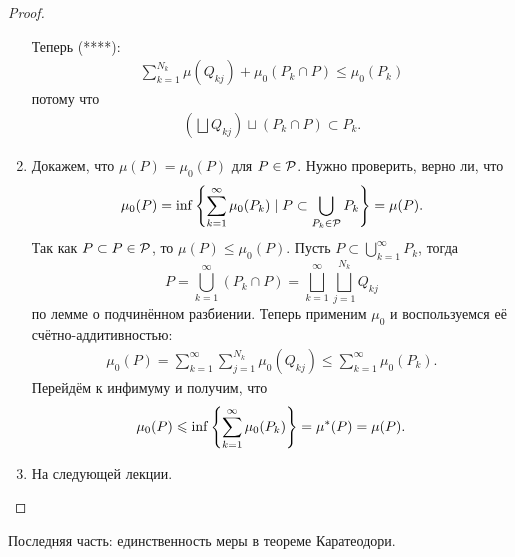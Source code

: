 \documentclass[a4paper,14pt]{extarticle}
\theoremstyle{definition}
\theoremstyle{plain}
\theoremstyle{plain}
\theoremstyle{plain}
\theoremstyle{plain}
\theoremstyle{definition}
\theoremstyle{definition}
\theoremstyle{definition}
\theoremstyle{definition}
\theoremstyle{definition}
\theoremstyle{definition}
\theoremstyle{plain}
\theoremstyle{plain}
\theoremstyle{plain}
\theoremstyle{plain}
\theoremstyle{definition}
\theoremstyle{definition}
\theoremstyle{definition}
\theoremstyle{definition}
\theoremstyle{definition}
\newcommand{\p}{\ensuremath \mathcal{P}}
\newcommand{\mua}{\ensuremath \mu^\ast}
\begin{document}
\begin{proof}
\begin{enumerate}
   Теперь (****):
   \begin{align*}
    \sum_{k=1}^{N_k}  \mu(Q_{kj}) + \mu_0(P_k \cap P) \leqslant \mu_0(P_k)
   \end{align*} потому что
   \begin{align*}
    \left( \bigsqcup Q_{kj} \right) \sqcup \left( P_k \cap P \right) \subset P_k
   .\end{align*}
  \item Докажем, что $ \mu(P) = \mu_0(P) $ для $ P \in \p $. Нужно проверить, верно ли, что
   \begin{align*}
    \mu_0(P) = \inf \left\{ \sum_{k=1}^{\infty} \mu_0(P_k) \mid P \subset \bigcup_{P_k \in \p} P_k \right\} = \mu(P)
   .\end{align*} Так как $ P \subset P \in \p $, то $ \mu(P) \leqslant \mu_0(P) $. Пусть $ P \subset \displaystyle\bigcup_{k=1}^\infty P_k $, тогда $$
   P = \bigcup_{k=1}^\infty (P_k \cap P) = \bigsqcup_{k=1}^\infty \bigsqcup_{j=1}^{N_k} Q_{kj}
   $$ по лемме о подчинённом разбиении. Теперь применим $ \mu_0 $ и воспользуемся её счётно-аддитивностью:
   \begin{align*}
    \mu_0(P) = \sum_{k=1}^{\infty} \sum_{j=1}^{N_k} \mu_0(Q_{kj}) \leqslant \sum_{k=1}^{\infty} \mu_0(P_k)
   .\end{align*} Перейдём к инфимуму и получим, что
   \begin{align*}
    \mu_0(P) \leqslant \inf \left\{ \sum_{k=1}^{\infty} \mu_0(P_k) \right\}  = \mua(P) = \mu(P)
   .\end{align*}
  \item На следующей лекции.
 \end{enumerate}
\end{proof}


Последняя часть: единственность меры в теореме Каратеодори.
\end{document}
